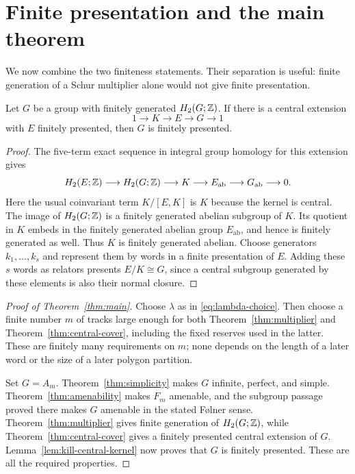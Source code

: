 \section{Finite presentation and the main theorem}\label{sec:conclusion}

We now combine the two finiteness statements. Their separation is
useful: finite generation of a Schur multiplier alone would not
give finite presentation.

\begin{lemma}\label{lem:kill-central-kernel}
Let $G$ be a group with finitely generated $H_2(G;\mathbb Z)$.
If there is a central extension
\[
 1\longrightarrow K\longrightarrow E\longrightarrow G
 \longrightarrow1
\]
with $E$ finitely presented, then $G$ is finitely presented.
\end{lemma}

\begin{proof}
The five-term exact sequence in integral group homology for this
extension \cite[6.8.3, p.~196]{Weibel1994} gives
\[
 H_2(E;\mathbb Z)\longrightarrow H_2(G;\mathbb Z)
 \longrightarrow K\longrightarrow E_{\mathrm{ab}}
 \longrightarrow G_{\mathrm{ab}}\longrightarrow0.
\]
Here the usual coinvariant term $K/[E,K]$ is $K$ because the kernel
is central. The image of $H_2(G;\mathbb Z)$ is a finitely generated
abelian subgroup of $K$. Its quotient in $K$ embeds in the finitely
generated abelian group $E_{\mathrm{ab}}$, and hence is finitely
generated as well. Thus $K$ is finitely generated abelian.
Choose generators $k_1,\ldots,k_s$ and represent them by words in a
finite presentation of $E$. Adding these $s$ words as relators
presents $E/K\cong G$, since a central subgroup generated by these
elements is also their normal closure.
\end{proof}

\begin{proof}[Proof of Theorem~\ref{thm:main}]
Choose $\lambda$ as in \eqref{eq:lambda-choice}. Then choose a
finite number $m$ of tracks large enough for both
Theorem~\ref{thm:multiplier} and Theorem~\ref{thm:central-cover},
including the fixed reserves used in the latter. These are finitely
many requirements on $m$; none depends on the length of a later
word or the size of a later polygon partition.

Set $G=A_m$. Theorem~\ref{thm:simplicity} makes $G$ infinite,
perfect, and simple. Theorem~\ref{thm:amenability} makes $F_m$
amenable, and the subgroup passage proved there makes $G$ amenable
in the stated F\o lner sense. Theorem~\ref{thm:multiplier} gives
finite generation of $H_2(G;\mathbb Z)$, while
Theorem~\ref{thm:central-cover} gives a finitely presented central
extension of $G$. Lemma~\ref{lem:kill-central-kernel} now proves
that $G$ is finitely presented. These are all the required
properties.
\end{proof}
